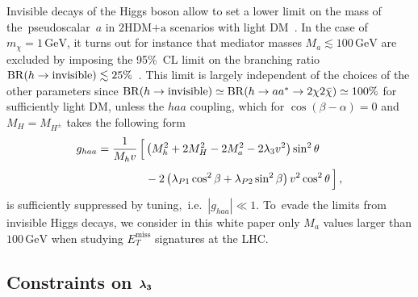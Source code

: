 \documentclass[review]{elsarticle}
\newcommand{\MET}{\ensuremath{E_T^\mathrm{miss}}\xspace}
\newcommand{\hdma}{\ensuremath{\textrm{2HDM+a}}\xspace}
\def\bm#1{\mbox{\boldmath$#1$\unboldmath}}
\begin{document}
Invisible decays of the Higgs boson allow to set a lower limit on the mass of  the~pseudoscalar~$a$ in \hdma scenarios with light DM~\cite{Bauer:2017ota}. In the case of $m_\chi = 1 \, {\mathrm{GeV}}$, it turns out for instance that mediator masses $M_a \lesssim 100 \, {\mathrm{GeV}}$ are excluded by imposing the 95\%~CL limit on the branching ratio ${\rm BR} (h \to  \text{invisible}) \lesssim 25\%$~\cite{Aad:2015pla,Khachatryan:2016whc}.  This limit is largely independent of the choices of the other parameters since ${\rm BR} (h \to  \text{invisible}) \simeq {\rm BR} (h \to a a^\ast \to 2 \chi 2 \bar \chi) \simeq 100\%$ for sufficiently light DM, unless  the $haa$ coupling, which for $\cos (\beta-\alpha) = 0$ and $M_H = M_{H^\pm}$ takes the following form~\cite{Bauer:2017ota}
\begin{equation}
\begin{split}
g_{haa} & = \frac{1}{M_h v}  \, \Big [ \left ( M_h^2  + 2 M_H^2  -  2 M_a^2 - 2 \lambda_3 v^2 \right) \sin^2 \theta \\[1mm] &  \hspace{1.5cm} - 2 \left (  \lambda_{P1} \cos^2 \beta + \lambda_{P2} \sin^2 \beta  \right ) v^2 \cos^2 \theta \, \Big ]  \,, 
\end{split}
\end{equation}
is sufficiently suppressed by tuning,~i.e.~$|g_{haa}| \ll 1$. To~evade the limits from invisible Higgs decays, we consider in this white paper only $M_a$ values larger than $100 \, {\mathrm{GeV}}$ when studying $\MET$ signatures at the LHC. 

\subsection[Constraints on $\lambda_3$]{Constraints on $\bm{\lambda_3}$}
\end{document}
